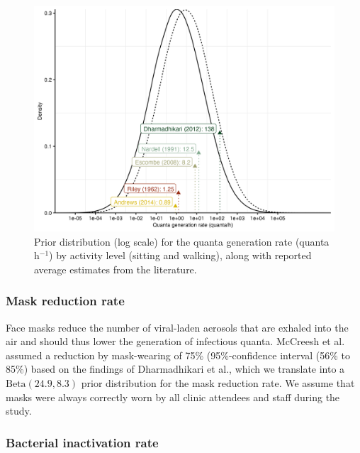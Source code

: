 \documentclass[fleqn,11pt]{wlscirep_supp}
\begin{document}
\begin{figure}[!htpb]
    \centering
    \includegraphics{results/inputs/quanta-generation-rate.png}
    \caption{Prior distribution (log scale) for the quanta generation rate (quanta h$^{-1}$) by activity level (sitting and walking), along with reported average estimates from the literature\cite{Andrews2014JID,Riley1962ARRD,Escombe2008PLoSMed,Nardell1991ARRD,Dharmadhikari2012AJRCCM}.}
    \label{fig:quanta-distribution}
\end{figure}

\subsubsection{Mask reduction rate}

Face masks reduce the number of viral-laden aerosols that are exhaled into the air\cite{Milton2013PLoSPathogens,Leung2020NatMed} and should thus lower the generation of infectious quanta. McCreesh et al. assumed a reduction by mask-wearing of 75\% (95\%-confidence interval (56\% to 85\%) based on the findings of Dharmadhikari et al.\cite{Dharmadhikari2012AJRCCM}, which we translate into a $\mathrm{Beta}(24.9, 8.3)$ prior distribution for the mask reduction rate. We assume that masks were always correctly worn by all clinic attendees and staff during the study. 

\subsubsection{Bacterial inactivation rate}
\end{document}
